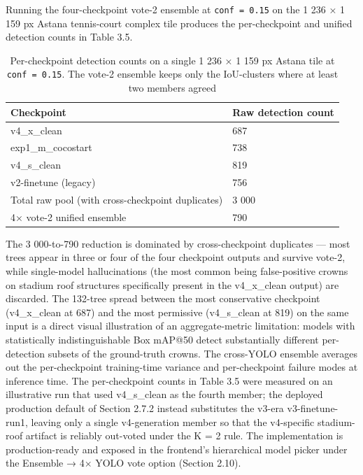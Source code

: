 Running the four-checkpoint vote-2 ensemble at \texttt{conf\ =\ 0.15} on the 1 236 × 1 159 px Astana tennis-court complex tile produces the per-checkpoint and unified detection counts in Table 3.5.

\begin{longtable}[]{@{}ll@{}}
\caption{Per-checkpoint detection counts on a single 1 236 × 1 159 px Astana tile at \texttt{conf\ =\ 0.15}. The vote-2 ensemble keeps only the IoU-clusters where at least two members agreed}\\
\endfirsthead

\toprule\noalign{}
Checkpoint & Raw detection count \\
\midrule\noalign{}
\endhead
\bottomrule\noalign{}
\endlastfoot
v4\_x\_clean & 687 \\
exp1\_m\_cocostart & 738 \\
v4\_s\_clean & 819 \\
v2-finetune (legacy) & 756 \\
Total raw pool (with cross-checkpoint duplicates) & 3 000 \\
4× vote-2 unified ensemble & 790 \\
\end{longtable}

The 3 000-to-790 reduction is dominated by cross-checkpoint duplicates --- most trees appear in three or four of the four checkpoint outputs and survive vote-2, while single-model hallucinations (the most common being false-positive crowns on stadium roof structures specifically present in the v4\_x\_clean output) are discarded. The 132-tree spread between the most conservative checkpoint (v4\_x\_clean at 687) and the most permissive (v4\_s\_clean at 819) on the same input is a direct visual illustration of an aggregate-metric limitation: models with statistically indistinguishable Box mAP@50 detect substantially different per-detection subsets of the ground-truth crowns. The cross-YOLO ensemble averages out the per-checkpoint training-time variance and per-checkpoint failure modes at inference time. The per-checkpoint counts in Table 3.5 were measured on an illustrative run that used v4\_s\_clean as the fourth member; the deployed production default of Section 2.7.2 instead substitutes the v3-era v3-finetune-run1, leaving only a single v4-generation member so that the v4-specific stadium-roof artifact is reliably out-voted under the K = 2 rule. The implementation is production-ready and exposed in the frontend's hierarchical model picker under the Ensemble → 4× YOLO vote option (Section 2.10).

